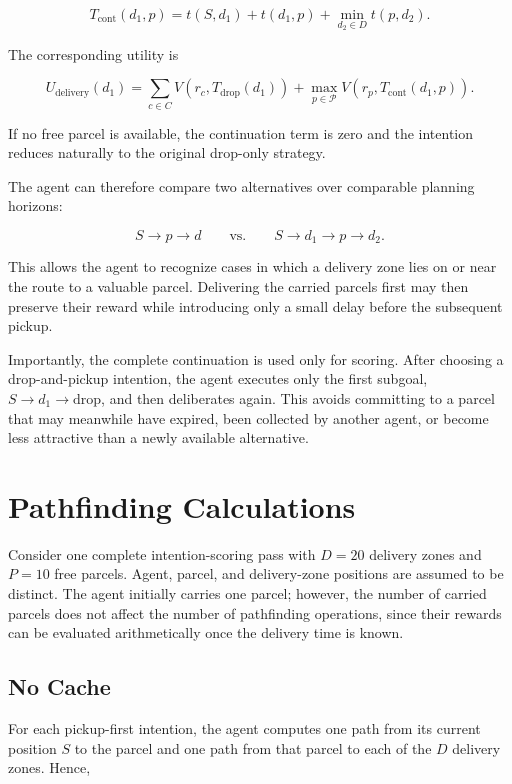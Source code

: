 \documentclass[a4paper]{article}
\begin{document}
\[
    T_{\mathrm{cont}}(d_1,p)
    =
    t(S,d_1) + t(d_1,p)
    + \min_{d_2 \in D} t(p,d_2).
\]

The corresponding utility is

\[
    U_{\mathrm{delivery}}(d_1)
    =
    \sum_{c \in C} V(r_c,T_{\mathrm{drop}}(d_1))
    +
    \max_{p \in \mathcal{P}}
    V(r_p,T_{\mathrm{cont}}(d_1,p)).
\]

If no free parcel is available, the continuation term is zero and the
intention reduces naturally to the original drop-only strategy.

The agent can therefore compare two alternatives over comparable planning
horizons:

\[
    S \rightarrow p \rightarrow d
    \qquad\text{vs.}\qquad
    S \rightarrow d_1 \rightarrow p \rightarrow d_2.
\]

This allows the agent to recognize cases in which a delivery zone lies on or
near the route to a valuable parcel. Delivering the carried parcels first may
then preserve their reward while introducing only a small delay before the
subsequent pickup.

Importantly, the complete continuation is used only for scoring. After choosing
a drop-and-pickup intention, the agent executes only the first subgoal,
$S \rightarrow d_1 \rightarrow \text{drop}$, and then deliberates again.
This avoids committing to a parcel that may meanwhile have expired, been
collected by another agent, or become less attractive than a newly available
alternative.

\section{Pathfinding Calculations}

Consider one complete intention-scoring pass with $D=20$ delivery zones
and $P=10$ free parcels. Agent, parcel, and delivery-zone positions are
assumed to be distinct. The agent initially carries one parcel; however,
the number of carried parcels does not affect the number of pathfinding
operations, since their rewards can be evaluated arithmetically once the
delivery time is known.

\subsection{No Cache}

For each pickup-first intention, the agent computes one path from its
current position $S$ to the parcel and one path from that parcel to each
of the $D$ delivery zones. Hence,
\end{document}
